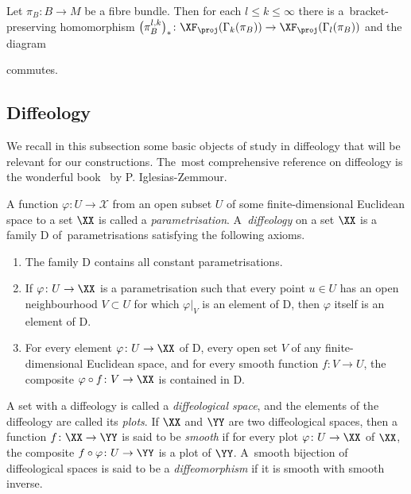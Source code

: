\begin{Proposition}\label{towerfield1}
Let $\pi_{B}\colon B\rightarrow M$ be a fibre bundle. Then for each $l\leq k\leq\infty$ there is a~bracket-preserving homomorphism $\big(\pi_{B}^{l,k}\big)_{*}\colon \XF_{\proj}(\Gamma_{k}(\pi_{B}))\rightarrow\XF_{\proj}(\Gamma_{l}(\pi_{B}))$ and the diagram
\begin{center}
\end{center}
commutes.
\end{Proposition}

\subsection{Diffeology}

We recall in this subsection some basic objects of study in diffeology that will be relevant for our constructions. The~most comprehensive reference on diffeology is the wonderful book~\cite{diffeology} by P. Iglesias-Zemmour.

\begin{Definition}\label{diffeology}
A function $\varphi\colon U\rightarrow \mathcal{X}$ from an open subset $U$ of some finite-dimensional Euclidean space to a set $\XX$ is called a \textit{parametrisation}. A~\textit{diffeology} on a set $\XX$ is a family D of~para\-metrisations satisfying the following axioms.
\begin{enumerate}\itemsep=0pt
\item The family D contains all constant parametrisations.
\item If $\varphi\colon U\rightarrow \XX$ is a parametrisation such that every point $u\in U$ has an open neighbourhood $V\subset U$ for which $\varphi|_{V}$ is an element of D, then $\varphi$ itself is an element of D.
\item For every element $\varphi\colon U\rightarrow \XX$ of D, every open set $V$ of any finite-dimensional Euclidean space, and for every smooth function $f\colon V\rightarrow U$, the composite $\varphi\circ f\colon V\rightarrow \XX$ is contained in D.
\end{enumerate}
A set with a diffeology is called a \textit{diffeological space}, and the elements of the diffeology are called its \textit{plots}. If $\XX$ and $\YY$ are two diffeological spaces, then a function $f\colon \XX\rightarrow \YY$ is said to be \textit{smooth} if for every plot $\varphi\colon U\rightarrow \XX$ of $\XX$, the composite $f\circ\varphi\colon U\rightarrow \YY$ is a plot of $\YY$. A~smooth bijection of diffeological spaces is said to be a \textit{diffeomorphism} if it is smooth with smooth inverse.
\end{Definition}

